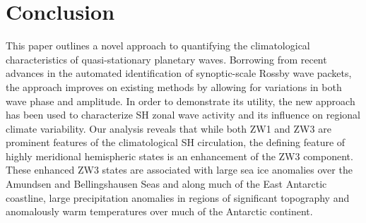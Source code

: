 \section{Conclusion}

This paper outlines a novel approach to quantifying the climatological characteristics of quasi-stationary planetary waves. Borrowing from recent advances in the automated identification of synoptic-scale Rossby wave packets, the approach improves on existing methods by allowing for variations in both wave phase and amplitude. In order to demonstrate its utility, the new approach has been used to characterize SH zonal wave activity and its influence on regional climate variability. Our analysis reveals that while both ZW1 and ZW3 are prominent features of the climatological SH circulation, the defining feature of highly meridional hemispheric states is an enhancement of the ZW3 component. These enhanced ZW3 states are associated with large sea ice anomalies over the Amundsen and Bellingshausen Seas and along much of the East Antarctic coastline, large precipitation anomalies in regions of significant topography and anomalously warm temperatures over much of the Antarctic continent. 

    